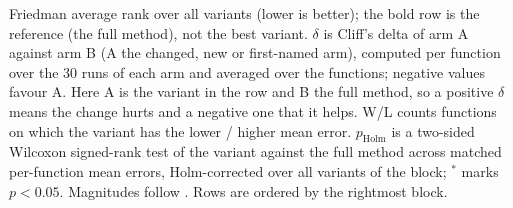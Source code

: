 \begin{table}[htbp]
\begin{flushleft}
Friedman average rank over all variants (lower is better); the bold row is the reference (the full method), not the best variant. $\delta$ is Cliff's delta of arm A against arm B (A the changed, new or first-named arm), computed per function over the 30 runs of each arm and averaged over the functions; negative values favour A. Here A is the variant in the row and B the full method, so a positive $\delta$ means the change hurts and a negative one that it helps. W/L counts functions on which the variant has the lower / higher mean error. $p_{\text{Holm}}$ is a two-sided Wilcoxon signed-rank test of the variant against the full method across matched per-function mean errors, Holm-corrected over all variants of the block; $^{*}$ marks $p<0.05$. Magnitudes follow \citet{romano2006appropriate}. Rows are ordered by the rightmost block.
\end{flushleft}
\end{table}
